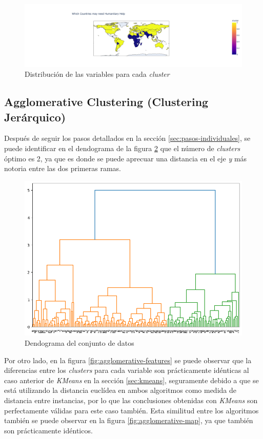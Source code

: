 \documentclass{article}
\begin{document}
\vspace{-10pt}

\begin{figure}[H]
  \centering
  \includegraphics[width=\linewidth]{../images/kmeans/map.png}
  \caption{Distribución de las variables para cada \textit{cluster}}
  \label{fig:kmeans-map}
\end{figure}

\subsection{Agglomerative Clustering (Clustering Jerárquico)}
\noindent Después de seguir los pasos detallados en la sección \ref{sec:pasos-individuales}, se puede identificar en el dendograma de la figura \ref{fig:dendogram} que el número de \textit{clusters} óptimo es 2,
ya que es donde se puede aprecuar una distancia en el eje \textit{y} más notoria entre las dos primeras ramas.

\begin{figure}[H]
  \centering
  \includegraphics[width=0.4\linewidth]{../images/agglomerative/dendogram.png}
  \caption{Dendograma del conjunto de datos}
  \label{fig:dendogram}
\end{figure}

\noindent Por otro lado, en la figura \ref{fig:agglomerative-features} se puede observar que la diferencias entre los \textit{clusters} para cada variable son prácticamente idénticas al caso anterior de \textit{KMeans} en la sección \ref{sec:kmeans}, seguramente debido a que se está utilizando la distancia euclídea en ambos algoritmos como medida de distancia entre instancias, por lo que las conclusiones obtenidas con \textit{KMeans} son perfectamente válidas para este caso también. 
Esta similitud entre los algoritmos también se puede observar en la figura \ref{fig:agglomerative-map}, ya que también son prácticamente idénticos.
\end{document}
